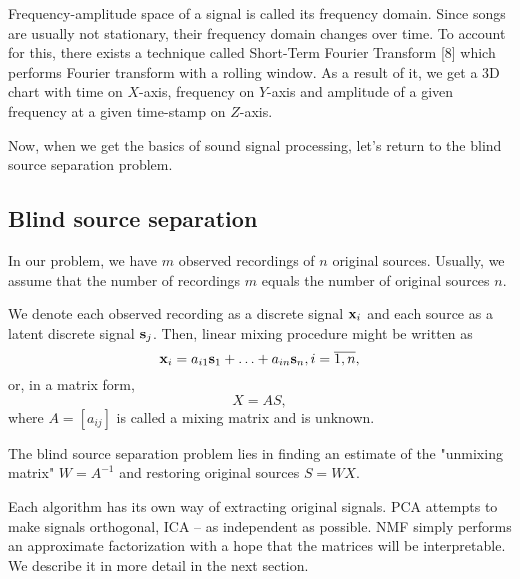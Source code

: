 \documentclass[../main.tex]{subfiles} %
\begin{document}
Frequency-amplitude space of a signal is called its frequency domain. Since songs are usually not stationary, their frequency domain changes over time. To account for this, there exists a technique called Short-Term Fourier Transform [8] which performs Fourier transform with a rolling window. As a result of it, we get a 3D chart with time on $X$-axis, frequency on $Y$-axis and amplitude of a given frequency at a given time-stamp on $Z$-axis.

Now, when we get the basics of sound signal processing, let's return to the blind source separation problem.

\subsection{Blind source separation}

In our problem, we have $m$ observed recordings of $n$ original sources. Usually, we assume that the number of recordings $m$ equals the number of original sources $n$.

We denote each observed recording as a discrete signal ${\mathbf x}_i$ and each source as a latent discrete signal ${\mathbf s}_j$. Then, linear mixing procedure might be written as 
\[ {\mathbf x}_i = a_{i1} {\mathbf s}_1 + \ldots + a_{in} {\mathbf s}_n, i = \overline{1, n}, \]
or, in a matrix form, 
\[ X = A S, \]
where $A = \left[a_{ij} \right]$ is called a mixing matrix and is unknown. 

The blind source separation problem lies in finding an estimate of the "unmixing matrix" $W = A^{-1}$  and restoring original sources $S = W X$. 

Each algorithm has its own way of extracting original signals. PCA attempts to make signals orthogonal, ICA -- as independent as possible. NMF simply performs an approximate factorization with a hope that the matrices will be interpretable. We describe it in more detail in the next section.
\end{document}
